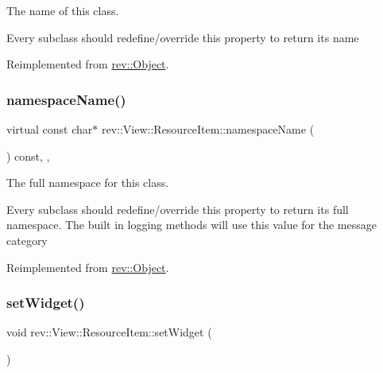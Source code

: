 The name of this class. 

Every subclass should redefine/override this property to return its name 

Reimplemented from \mbox{\hyperlink{classrev_1_1_object_a7a2013f91169479b65cf93afdc5d9a68}{rev\+::\+Object}}.

\mbox{\label{classrev_1_1_view_1_1_resource_item_a15af214f49adc7e9e793a0a1d43a4e60}} 
\subsubsection{\texorpdfstring{namespaceName()}{namespaceName()}}
{\footnotesize\ttfamily virtual const char$\ast$ rev\+::\+View\+::\+Resource\+Item\+::namespace\+Name (\begin{DoxyParamCaption}{ }\end{DoxyParamCaption}) const\hspace{0.3cm}{\ttfamily [inline]}, {\ttfamily [override]}, {\ttfamily [virtual]}}



The full namespace for this class. 

Every subclass should redefine/override this property to return its full namespace. The built in logging methods will use this value for the message category 

Reimplemented from \mbox{\hyperlink{classrev_1_1_object_aaeb638d3e10f361c56c211a318a27f3d}{rev\+::\+Object}}.

\mbox{\label{classrev_1_1_view_1_1_resource_item_a3bb7af636d29308aa374f0845a69e483}} 
\subsubsection{\texorpdfstring{setWidget()}{setWidget()}}
{\footnotesize\ttfamily void rev\+::\+View\+::\+Resource\+Item\+::set\+Widget (\begin{DoxyParamCaption}{ }\end{DoxyParamCaption})}



